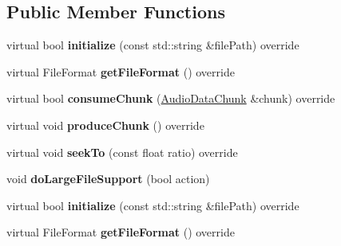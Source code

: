 \subsection*{Public Member Functions}
\begin{DoxyCompactItemize}
\item 
\mbox{\label{classexperimental_1_1MP3Reader_a2549c1898054c1ab5f11891d667e645f}} 
virtual bool {\bfseries initialize} (const std\+::string \&file\+Path) override
\item 
\mbox{\label{classexperimental_1_1MP3Reader_a1eb44b66fae82c621109ba3658a795d1}} 
virtual File\+Format {\bfseries get\+File\+Format} () override
\item 
\mbox{\label{classexperimental_1_1MP3Reader_a043d3d9f491b6fa5aede54b59ddaeff2}} 
virtual bool {\bfseries consume\+Chunk} (\hyperlink{structexperimental_1_1AudioDataChunk}{Audio\+Data\+Chunk} \&chunk) override
\item 
\mbox{\label{classexperimental_1_1MP3Reader_a82885ce6df03ba1f419486a9e81c0ca0}} 
virtual void {\bfseries produce\+Chunk} () override
\item 
\mbox{\label{classexperimental_1_1MP3Reader_a26973f2926317bc98930f7a8487fc166}} 
virtual void {\bfseries seek\+To} (const float ratio) override
\item 
\mbox{\label{classexperimental_1_1MP3Reader_a3b38058930f37a88b3db567e60d8011b}} 
void {\bfseries do\+Large\+File\+Support} (bool action)
\item 
\mbox{\label{classexperimental_1_1MP3Reader_a2549c1898054c1ab5f11891d667e645f}} 
virtual bool {\bfseries initialize} (const std\+::string \&file\+Path) override
\item 
\mbox{\label{classexperimental_1_1MP3Reader_a1eb44b66fae82c621109ba3658a795d1}} 
virtual File\+Format {\bfseries get\+File\+Format} () override
\item 
\mbox{\label{classexperimental_1_1MP3Reader_a043d3d9f491b6fa5aede54b59ddaeff2}} 

\end{DoxyCompactItemize}
